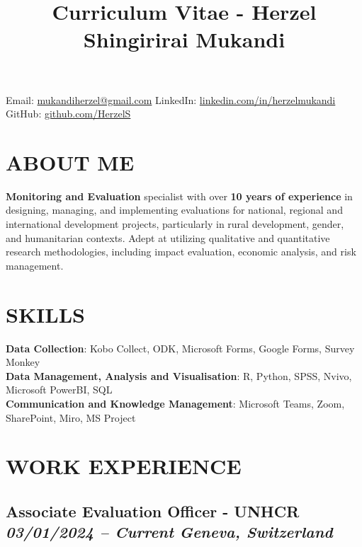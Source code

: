 \documentclass[
  10pt,
]{article}
\title{Curriculum Vitae - Herzel Shingirirai Mukandi}
\author{}
\date{\vspace{-2.5em}}
\begin{document}
\maketitle

\vspace{-2em}

\begin{center}
{\small
Email: \textcolor{blue}{\href{mailto:mukandiherzel@gmail.com}{mukandiherzel@gmail.com}} \quad
LinkedIn: \textcolor{blue}{\href{https://www.linkedin.com/in/herzelmukandi}{linkedin.com/in/herzelmukandi}} \quad
GitHub: \textcolor{blue}{\href{https://github.com/HerzelS}{github.com/HerzelS}}
}
\end{center}

\vspace{0.5em}

\section{ABOUT ME}\label{about-me}

\textbf{Monitoring and Evaluation} specialist with over \textbf{10 years
of experience} in designing, managing, and implementing evaluations for
national, regional and international development projects, particularly
in rural development, gender, and humanitarian contexts. Adept at
utilizing qualitative and quantitative research methodologies, including
impact evaluation, economic analysis, and risk management.

\section{SKILLS}\label{skills}

\textbf{Data Collection}: Kobo Collect, ODK, Microsoft Forms, Google
Forms, Survey Monkey\\
\textbf{Data Management, Analysis and Visualisation}: R, Python, SPSS,
Nvivo, Microsoft PowerBI, SQL\\
\textbf{Communication and Knowledge Management}: Microsoft Teams, Zoom,
SharePoint, Miro, MS Project

\section{WORK EXPERIENCE}\label{work-experience}

\subsection{\texorpdfstring{Associate Evaluation Officer - UNHCR
\emph{03/01/2024 -- Current} \textbar{} \emph{Geneva,
Switzerland}}{Associate Evaluation Officer - UNHCR 03/01/2024 -- Current \textbar{} Geneva, Switzerland}}\label{associate-evaluation-officer---unhcr-03012024-current-geneva-switzerland}
\end{document}
